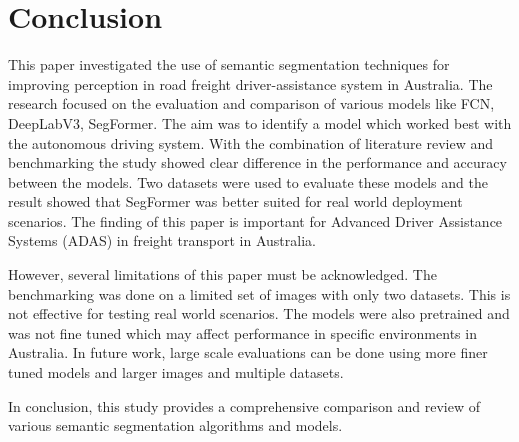 \documentclass[10pt,journal,compsoc]{IEEEtran}
\begin{document}
\section{Conclusion}
This paper investigated the use of semantic segmentation techniques for improving perception in road freight driver-assistance system in Australia. The research focused on the evaluation and comparison of various models like FCN, DeepLabV3, SegFormer. The aim was to identify a model which worked best with the autonomous driving system. With the combination of literature review and benchmarking the study showed clear difference in the performance and accuracy between the models. Two datasets were used to evaluate these models and the result showed that SegFormer was better suited for real world deployment scenarios. The finding of this paper is important for Advanced Driver Assistance Systems (ADAS) in freight transport in Australia.

However, several limitations of this paper must be acknowledged. The benchmarking was done on a limited set of images with only two datasets. This is not effective for testing real world scenarios. The models were also pretrained and was not fine tuned which may affect performance in specific environments in Australia. In future work, large scale evaluations can be done using more finer tuned models and larger images and multiple datasets.

In conclusion, this study provides a comprehensive comparison and review of various semantic segmentation algorithms and models.






%
\end{document}
